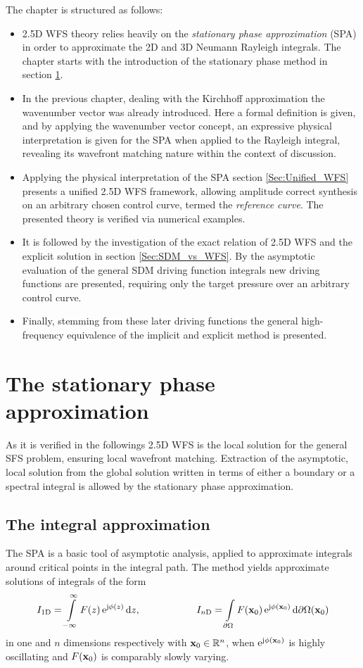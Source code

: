 \vspace{3mm}
The chapter is structured as follows:
\begin{itemize}
\item 2.5D WFS theory relies heavily on the \emph{stationary phase approximation} (SPA) in order to approximate the 2D and 3D Neumann Rayleigh integrals.
The chapter starts with the introduction of the stationary phase method in section \ref{Section:25D_WFS:SPA}.
\item In the previous chapter, dealing with the Kirchhoff approximation the wavenumber vector was already introduced.
Here a formal definition is given, and by applying the wavenumber vector concept, an expressive physical interpretation is given for the SPA when applied to the Rayleigh integral, revealing its wavefront matching nature within the context of discussion.
\item Applying the physical interpretation of the SPA section \ref{Sec:Unified_WFS} presents a unified 2.5D WFS framework, allowing amplitude correct synthesis on an arbitrary chosen control curve, termed the \emph{reference curve}.
The presented theory is verified via numerical examples.
\item It is followed by the investigation of the exact relation of 2.5D WFS and the explicit solution in section \ref{Sec:SDM_vs_WFS}.
By the asymptotic evaluation of the general SDM driving function integrals new driving functions are presented, requiring only the target pressure over an arbitrary control curve.
\item Finally, stemming from these later driving functions the general high-frequency equivalence of the implicit and explicit method is presented.
\end{itemize}

%
\section{The stationary phase approximation}
\label{Section:25D_WFS:SPA}
%
As it is verified in the followings 2.5D WFS is the local solution for the general SFS problem, ensuring local wavefront matching.
Extraction of the asymptotic, local solution from the global solution written in terms of either a boundary or a spectral integral is allowed by the stationary phase approximation.

\subsection{The integral approximation}
%
The SPA is a basic tool of asymptotic analysis, applied to approximate integrals around critical points in the integral path.
The method yields approximate solutions of integrals of the form
\begin{equation}
\label{Eq:SPAintegral_1d_nd}
I_{1\mathrm{D}} = \int\limits_{-\infty}^{\infty} F(z) \, \te^{\ti \phi(z)} \, \td z,
\hspace{20mm} 
I_{n\mathrm{D}} = \int\limits_{\dO} F(\vxo) \, \te^{\ti \phi(\vxo)} \, \td \dO(\vxo)
\end{equation}
in one and $n$ dimensions respectively with $\mathbf{x}_0 \in \mathbb{R}^{n}$, when $\mathrm{e}^{\mathrm{j} \phi(\mathbf{x}_0)}$ is highly oscillating and $F(\mathbf{x}_0)$ is comparably slowly varying.


